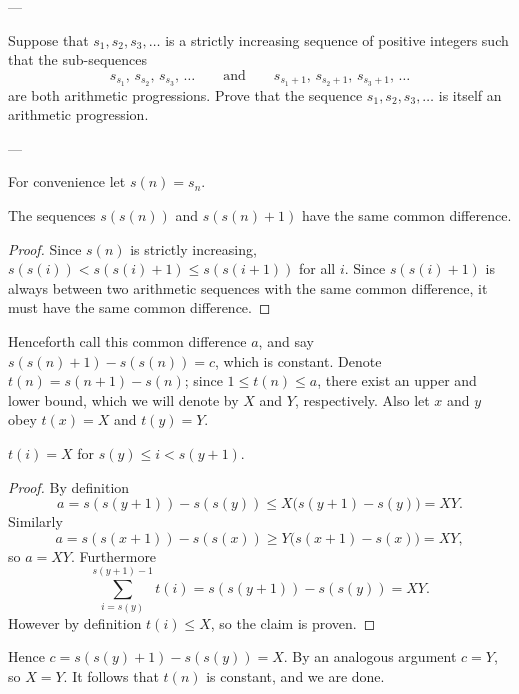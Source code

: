 
---

Suppose that $ s_1,s_2,s_3, \ldots$ is a strictly increasing sequence of positive integers such that the sub-sequences\[s_{s_1},\, s_{s_2},\, s_{s_3},\, \ldots\qquad\text{and}\qquad s_{s_1+1},\, s_{s_2+1},\, s_{s_3+1},\, \ldots\]are both arithmetic progressions. Prove that the sequence $ s_1, s_2, s_3, \ldots$ is itself an arithmetic progression.

---

For convenience let $s(n)=s_n$.
\begin{iclaim}
    The sequences $s(s(n))$ and $s(s(n)+1)$ have the same common difference.
\end{iclaim}
\begin{proof}
    Since $s(n)$ is strictly increasing, $s(s(i))<s(s(i)+1)\le s(s(i+1))$ for all $i$. Since $s(s(i)+1)$ is always between two arithmetic sequences with the same common difference, it must have the same common difference.
\end{proof}

Henceforth call this common difference $a$, and say $s(s(n)+1)-s(s(n))=c$, which is constant. Denote $t(n)=s(n+1)-s(n)$; since $1\le t(n)\le a$, there exist an upper and lower bound, which we will denote by $X$ and $Y$, respectively. Also let $x$ and $y$ obey $t(x)=X$ and $t(y)=Y$.
\begin{iclaim}
    $t(i)=X$ for $s(y)\le i<s(y+1)$.
\end{iclaim}
\begin{proof}
    By definition \[a=s(s(y+1))-s(s(y))\le X\big(s(y+1)-s(y)\big)=XY.\]
    Similarly \[a=s(s(x+1))-s(s(x))\ge Y\big(s(x+1)-s(x)\big)=XY,\]
    so $a=XY$. Furthermore \[\sum_{i=s(y)}^{s(y+1)-1}t(i)=s(s(y+1))-s(s(y))=XY.\]
    However by definition $t(i)\le X$, so the claim is proven.
\end{proof}

Hence $c=s(s(y)+1)-s(s(y))=X$. By an analogous argument $c=Y$, so $X=Y$. It follows that $t(n)$ is constant, and we are done.

